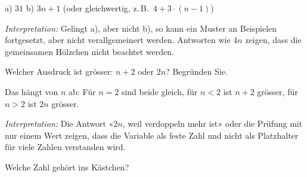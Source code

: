 \documentclass[11pt]{exam}
\newcommand{\aufgabe}[1]{%
  \needspace{8\baselineskip}%
  \renewcommand{\questionlabel}{\textbf{#1}}%
  \question}
\newcommand{\kaestchen}{\fbox{\rule{0pt}{1.1em}\hspace{1.6em}}}
\newcommand{\raum}[1]{\ifprintanswers\else\fillwithgrid{#1}\fi}
\newcommand{\diagnose}[1]{\par\smallskip\textit{Interpretation:} #1}
\begin{document}
\begin{questions}
\begin{center}
\end{center}
\begin{solution}
  a) $31$ \qquad b) $3n + 1$ (oder gleichwertig, z.\,B.\ $4 + 3 \cdot (n-1)$)
  \diagnose{Gelingt a), aber nicht b), so kann ein Muster an Beispielen
  fortgesetzt, aber nicht verallgemeinert werden. Antworten wie $4n$ zeigen, dass
  die gemeinsamen Hölzchen nicht beachtet werden.}
\end{solution}
\raum{3.5cm}

\aufgabe{5.2}
Welcher Ausdruck ist grösser: $n + 2$ oder $2n$? Begründen Sie.
\begin{solution}
  Das hängt von $n$ ab: Für $n = 2$ sind beide gleich, für $n < 2$ ist $n + 2$
  grösser, für $n > 2$ ist $2n$ grösser.
  \diagnose{Die Antwort «$2n$, weil verdoppeln mehr ist» oder die Prüfung mit
  nur einem Wert zeigen, dass die Variable als feste Zahl und nicht als
  Platzhalter für viele Zahlen verstanden wird.}
\end{solution}
\raum{3cm}

\aufgabe{6.1}
Welche Zahl gehört ins Kästchen?
\end{questions}
\end{document}
